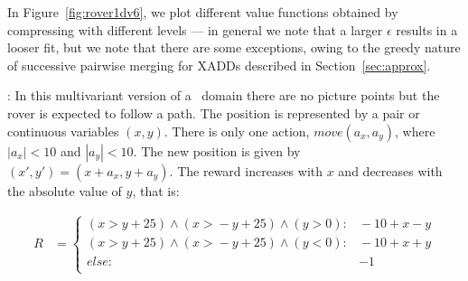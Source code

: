 In Figure~\ref{fig:rover1dv6}, we plot different value functions obtained by compressing with different levels --- in general we note that a larger $\epsilon$ results in a looser fit, but we note that there are some exceptions, owing to the greedy nature of successive pairwise merging for XADDs described in Section~\ref{sec:approx}.

\MarsRoverBi: In this multivariant version of a \MarsRover~domain there are no picture points but the rover is expected to follow a path. The position is represented by a pair or continuous variables $(x,y)$. There is only one action, $move(a_x,a_y)$, where $|a_x| < 10$ and $|a_y| < 10$. The new position is given by $(x',y') = ( x+a_x, y+a_y)$. The reward increases with $x$ and decreases with the absolute value of $y$, that is:

\vspace{-6mm}
{\footnotesize
\begin{align*}
R & = \begin{cases}
(x \!>\! y +25) \wedge (x \!>\! - y  +25) \wedge (y \!>\!0): &\!\!-10 + x -y\\
(x \!>\! y +25) \wedge (x \!>\! - y  +25) \wedge (y \!<\!0): &\!\!-10 + x +y\\
else: & -1\\
\end{cases}
\end{align*}}
\vspace{-6mm}

